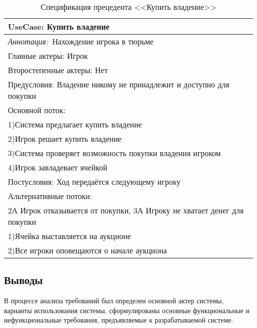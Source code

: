 \begin{Large}
\begin{table}[h!]
\begin{tabular}{|l|}
    \hline
\end{tabular}  
\end{table}
\newpage
\begin{table}[h!]
    \caption{Спецификация прецедента <<Купить владение>>}
    \begin{tabular}{|l|}
        \hline
        \textbf{UseCase: Купить владение}\\
        \hline
        \textit{Аннотация:}\ Нахождение игрока в тюрьме\\
        \hline
        Главные актеры: Игрок \\
        \hline
        Второстепенные актеры: Нет \\
        \hline
        Предусловия: Владение никому не принадлежит и доступно для покупки \\
        \hline
        Основной поток: \\
            1)Система предлагает купить владение \\
            2)Игрок решает купить владение \\
            3)Система проверяет возможность покупки владения игроком \\
            4)Игрок завладевает ячейкой\\
        \hline
        Постусловия: Ход передаётся следующему игроку\\
        \hline
        Альтернативные потоки:\\
        2А Игрок отказывается от покупки, 3А Игроку не хватает денег для покупки\\
        1)Ячейка выставляется на аукционе\\
        2)Все игроки оповещаются о начале аукциона\\
        \hline
    \end{tabular}  
\end{table}
\subsection*{Выводы}
В процессе анализа требований был определен основной актер системы, варианты использования системы, сформулированы основные функциональные и нефункциональные требования, предъявляемые к разрабатываемой системе.
\end{Large}